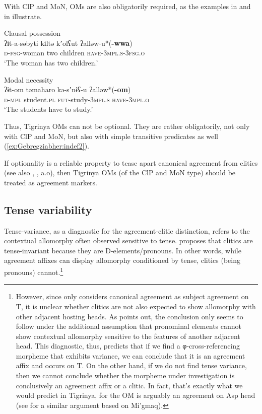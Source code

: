 \documentclass[output=paper]{langscibook}
\begin{document}
\noindent With ClP and MoN, OMs are also obligatorily required, as the  examples in  and in  illustrate.

\ea
\ea\label{ex:Gebregziabher:OCP} Clausal possession \\
\gll ʔɨt-a-səbyti kɨltə kʼolʕut ʔalləw-u*({\textbf{-wwa}}) \\
{\scshape d-fsg}-woman two children {\scshape have-3mpl.s-3fsg.o}\\
\glt `The woman has two children.'

\ex\label{ex:Gebregziabher:OMN} Modal necessity \\
\gll ʔɨt-om təmaharo kə-sʼnɨʕ-u ʔalləw*({\textbf{-om}}) \\
{\scshape d-mpl}  student.{\scshape pl} {\scshape fut}-study-{\scshape 3mpl.s} {\scshape have-3mpl.o} \\
\glt `The students have to study.'
\z
\z

Thus, Tigrinya OMs can not be optional. They are rather obligatorily, not only with ClP and MoN, but also with simple transitive predicates as well (\ref{ex:Gebregziabher:indef2}). 

If optionality is a reliable property to tease apart canonical agreement from clitics (see also \citealt{kramer14}, \citealt{ana17}, a.o), then Tigrinya OMs (of the ClP and MoN type) should be treated as agreement markers.


\subsection{Tense variability}
Tense-variance, as a diagnostic for the agreement-clitic distinction, refers to the contextual allomorphy often observed sensitive to tense. \citet{nevins11a} proposes that clitics are tense-invariant because they are D-elements/pronouns. In other words, while agreement affixes can display allomorphy conditioned by tense, clitics (being pronouns) cannot.\footnote{However, since \citeauthor{nevins11a} only considers canonical agreement as subject agreement on T, it is unclear whether clitics are not also expected to show allomorphy with other adjacent hosting heads. As \citet[1082, fn55]{harizanov14} points out, the conclusion only seems to follow under the additional assumption that pronominal elements cannot show contextual allomorphy sensitive to the features of another adjacent head. This diagnostic, thus, predicts that if we find a φ-cross-referencing morpheme that exhibits variance, we can conclude that it is an agreement affix and occurs on T. On the other hand, if we do not find tense variance, then we cannot conclude whether the morpheme under investigation is conclusively an agreement affix or a clitic. In fact, that's exactly what we would predict  in Tigrinya, for the OM is arguably an agreement on Asp head (see \citealt{hamilton14} for a similar argument based on Mi'gmaq).}
 
\end{document}
